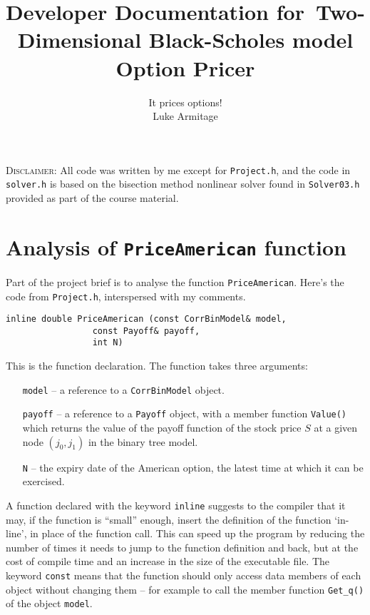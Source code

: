 \documentclass[12pt,a4paper]{article}
\author{It prices options! \\ Luke Armitage}\date{}
\title{{\bfseries Developer Documentation} for~Two-Dimensional Black-Scholes model Option Pricer}
\begin{document}
\maketitle

\textsc{Disclaimer}: All code was written by me except for \texttt{Project.h}, and the code in \texttt{solver.h} is based on the bisection method nonlinear solver found in \texttt{Solver03.h} provided as part of the course material.




\section{Analysis of \texttt{PriceAmerican} function}
Part of the project brief is to analyse the function \texttt{PriceAmerican}. 
Here's the code from \texttt{Project.h}, interspersed with my comments.

\begin{lstlisting}
inline double PriceAmerican (const CorrBinModel& model, 
			     const Payoff& payoff, 
			     int N)
\end{lstlisting}
This is the function declaration. 
The function takes three arguments:
\begin{itemize}
	\item[\texttt{model}] -- a reference to a \texttt{CorrBinModel} object.
	\item[\texttt{payoff}] -- a reference to a \texttt{Payoff} object, with a 
member function \texttt{Value()} which returns the value of the payoff function 
of the stock price $S$ at a given node $(j_0,j_1)$ in the binary tree model.
	\item[\texttt{N}] -- the expiry date of the American option, the latest time at 
which it can be exercised.
\end{itemize}
A function declared with the keyword \texttt{inline} suggests to the compiler that it may, if the function is ``small'' enough, insert the definition of the function `in-line', in place of the function call. This can speed up the program by reducing the number of times it needs to jump to the function definition and back, but at the cost of compile time and an increase in the size of the executable file. The keyword \texttt{const} means that the function should only access data members of each object without changing them -- for example to call the member function \texttt{Get\_q()} of the object \texttt{model}.
\end{document}
